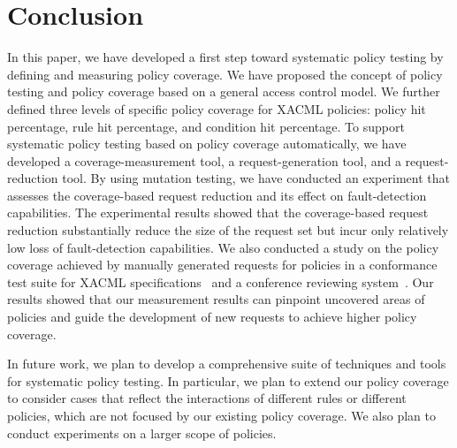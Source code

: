 \section{Conclusion}
\label{sec:conclusion}

In this paper, we have developed a first step toward systematic
policy testing by defining and measuring policy coverage. We have
proposed the concept of policy testing and policy coverage based
on a general access control model. We further defined three levels
of specific policy coverage for XACML policies: policy hit
percentage, rule hit percentage, and condition hit percentage. To
support systematic policy testing based on policy coverage
automatically, we have developed a coverage-measurement tool, a
request-generation tool, and a request-reduction tool. By using
mutation testing, we have conducted an experiment that assesses
the coverage-based request reduction and its effect on
fault-detection capabilities. The experimental results showed that
the coverage-based request reduction substantially reduce the size
of the request set but incur only relatively low loss of
fault-detection capabilities. We also conducted a study on the
policy coverage achieved by manually generated requests for
policies in a conformance test suite for XACML
specifications~\cite{anderson02:xacml} and a conference reviewing
system~\cite{zhang04:synthesis}. Our results showed that our
measurement results can pinpoint uncovered areas of policies and
guide the development of new requests to achieve higher policy
coverage.

In future work, we plan to develop a comprehensive suite of
techniques and tools for systematic policy testing. In particular,
we plan to extend our policy coverage to consider cases that
reflect the interactions of different rules or different policies,
which are not focused by our existing policy coverage. We also
plan to conduct experiments on a larger scope of policies.

